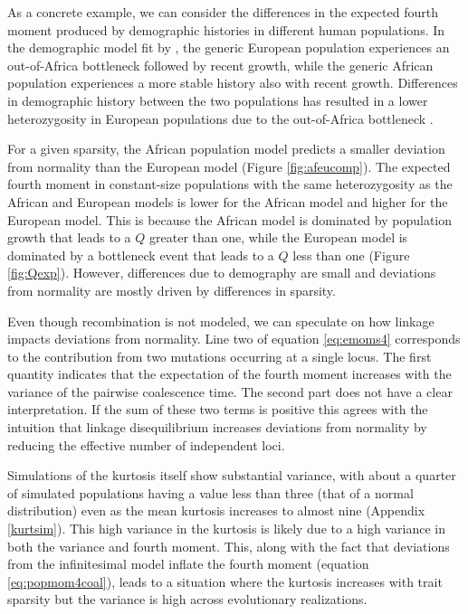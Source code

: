 As a concrete example, we can consider the differences in the expected fourth
moment produced by demographic histories in different human populations. In the
demographic model fit by \citet{Tennessen2012}, the generic European population
experiences an out-of-Africa bottleneck followed by recent growth, while the
generic African population experiences a more stable history also with recent
growth. Differences in demographic history between the two populations has
resulted in a lower heterozygosity in European populations due to the
out-of-Africa bottleneck \citep{Yu2002}.

For a given sparsity, the African population model predicts a smaller deviation
from normality than the European model (Figure \ref{fig:afeucomp}). The expected
fourth moment in constant-size populations with the same heterozygosity as the
African and European models is lower for the African model and higher for the
European model. This is because the African model is dominated by population
growth that leads to a $Q$ greater than one, while the European model is
dominated by a bottleneck event that leads to a $Q$ less than one (Figure
\ref{fig:Qexp}). However, differences due to demography are small and deviations
from normality are mostly driven by differences in sparsity.

Even though recombination is not modeled, we can speculate on how linkage
impacts deviations from normality. Line two of equation \eqref{eq:emoms4}
corresponds to the contribution from two mutations occurring at a single locus.
The first quantity indicates that the expectation of the fourth moment increases
with the variance of the pairwise coalescence time. The second part does not
have a clear interpretation. If the sum of these two terms is positive this
agrees with the intuition that linkage disequilibrium increases deviations from
normality by reducing the effective number of independent loci.

Simulations of the kurtosis itself show substantial variance, with about a
quarter of simulated populations having a value less than three (that of a
normal distribution) even as the mean kurtosis increases to almost nine
(Appendix \ref{kurtsim}). This high variance in the kurtosis is likely due to a
high variance in both the variance and fourth moment. This, along with the fact
that deviations from the infinitesimal model inflate the fourth moment
(equation \eqref{eq:popmom4coal}), leads to a situation where the kurtosis
increases with trait sparsity but the variance is high across evolutionary
realizations.
